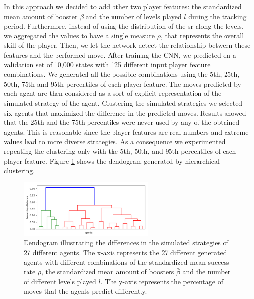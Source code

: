 In this approach we decided to add other two player features: the standardized mean amount of booster $\bar{\beta}$ and the number of levels played $l$ during the tracking period. Furthermore, instead of using the distribution of the \acs{sr} along the levels, we aggregated the values to have a single measure $\bar{\rho}$, that represents the overall skill of the player. Then, we let the network detect the relationship between these features and the performed move. After training the \acs{CNN}, we predicted on a validation set of 10,000 states with 125 different input player feature combinations. We generated all the possible combinations using the 5th, 25th, 50th, 75th and 95th percentiles of each player feature. The moves predicted by each agent are then considered as a sort of explicit representation of the simulated strategy of the agent. Clustering the simulated strategies we selected six agents that maximized the difference in the predicted moves. Results showed that the 25th and the 75th percentiles were never used by any of the obtained agents. This is reasonable since the player features are real numbers and extreme values lead to more diverse strategies. As a consequence we experimented repeating the clustering only with the 5th, 50th, and 95th percentiles of each player feature. Figure \ref{fig:hierarchical_clustering} shows the dendogram generated by hierarchical clustering. 
\begin{figure}[h!]
  \centering
    \includegraphics[width=0.6\textwidth]{masters-thesis-master/masters-thesis/contents/04_results/Player_Modeling/Sim_strategies/Plots/hierarchical.png}
    \caption{Dendogram illustrating the differences in the simulated strategies of 27 different agents. The x-axis represents the 27 different generated agents with different combinations of the standardized mean success rate $\bar{\rho}$, the standardized mean amount of boosters $\bar{\beta}$ and the number of different levels played $l$. The y-axis represents the percentage of moves that the agents predict differently. 
    }
    \label{fig:hierarchical_clustering}
\end{figure}
